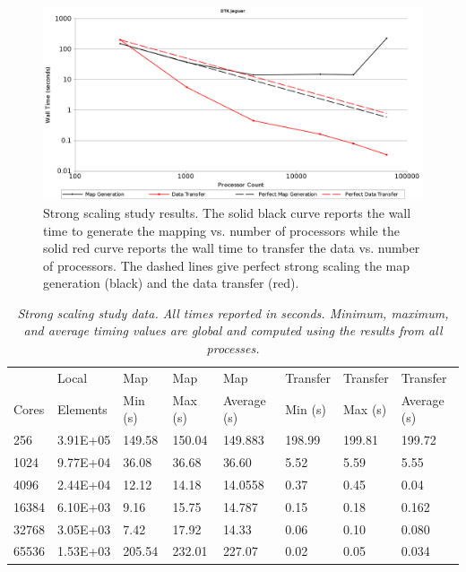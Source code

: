 \documentclass{mc2013}
\begin{document}
\begin{figure}[htpb!]
  \centering
  \includegraphics[width=5.5in]{StrongScaling.png}
  \caption{Strong scaling study results. The solid black curve reports
    the wall time to generate the mapping vs. number of processors
    while the solid red curve reports the wall time to transfer the
    data vs. number of processors. The dashed lines give
    perfect strong scaling the map generation (black) and the data
    transfer (red).}
  \label{fig:strong_scaling}
\end{figure}

\begin{table}[htpb!]
  \begin{center}
    \begin{tabular}{llllllll}\hline\hline
      \multicolumn{1}{l}{}& 
      \multicolumn{1}{l}{Local} & 
      \multicolumn{1}{l}{Map} & 
      \multicolumn{1}{l}{Map} & 
      \multicolumn{1}{l}{Map} & 
      \multicolumn{1}{l}{Transfer} & 
      \multicolumn{1}{l}{Transfer} & 
      \multicolumn{1}{l}{Transfer}\\
      \multicolumn{1}{l}{Cores} & 
      \multicolumn{1}{l}{Elements} & 
      \multicolumn{1}{l}{Min (s)} & 
      \multicolumn{1}{l}{Max (s)} & 
      \multicolumn{1}{l}{Average (s)} & 
      \multicolumn{1}{l}{Min (s)} & 
      \multicolumn{1}{l}{Max (s)} & 
      \multicolumn{1}{l}{Average (s)}\\ \hline\hline
256 &	3.91E+05 & 149.58&	150.04 & 149.883 & 198.99 & 199.81 & 199.72 \\
1024 &	9.77E+04 & 36.08 &	36.68 &	36.60 &	5.52 &	5.59 &	5.55 \\
4096 &	2.44E+04 & 12.12 &	14.18 &	14.0558 &	0.37 &	0.45 &	0.04 \\
16384 &	6.10E+03 & 9.16 &	15.75 & 14.787	& 0.15 & 0.18 &	0.162 \\
32768 &	3.05E+03 & 7.42 &	17.92 &	14.33 & 0.06 &	0.10 &	0.080 \\
65536 &	1.53E+03 & 205.54 &	232.01 & 227.07 & 0.02 & 0.05 &	0.034 \\
      \hline\hline
    \end{tabular}
  \end{center}
  \caption{\sl Strong scaling study data. All times reported in
    seconds. Minimum, maximum, and average timing values are global
    and computed using the results from all processes.}
  \label{tab:strong_scaling}
\end{table}
\end{document}
